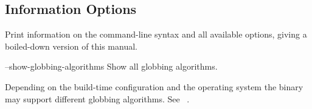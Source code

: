

\subsection[Information Options\commonpart]{\label{sec:information-options}%
  Information Options\commonpart}

\begin{codelist}
  \label{opt:help}%
\item[\itempar{-h \\ --help}]\itemend
  Print information on the command-line syntax and all available options, giving a boiled-down
  version of this manual.


  \label{opt:show-globbing-algorithms}%
\item[--show-globbing-algorithms]\itemend
  Show all globbing algorithms.

  Depending on the build-time configuration and the operating system the binary may support
  different globbing algorithms.  See \sectionName~.



\end{codelist}
